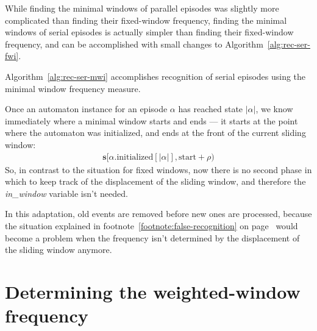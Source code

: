 While finding the minimal windows of parallel episodes was slightly more complicated than finding their fixed-window frequency, finding the minimal windows of serial episodes is actually simpler than finding their fixed-window frequency, and can be accomplished with small changes to Algorithm~\ref{alg:rec-ser-fwi}.

Algorithm~\ref{alg:rec-ser-mwi} accomplishes recognition of serial episodes using the minimal window frequency measure.

Once an automaton instance for an episode $ \alpha $ has reached state $ | \alpha | $, we know immediately where a minimal window starts and ends --- it starts at the point where the automaton was initialized, and ends at the front of the current sliding window:
\begin{align*}
\boldsymbol{s}[\alpha \text{.initialized}[| \alpha |], \allowbreak \text{start} + \rho)
\end{align*}
So, in contrast to the situation for fixed windows, now there is no second phase in which to keep track of the displacement of the sliding window, and therefore the \emph{in\_window} variable isn't needed.

In this adaptation, old events are removed before new ones are processed, because the situation explained in footnote~\ref{footnote:false-recognition} on page~\pageref{footnote:false-recognition} would become a problem when the frequency isn't determined by the displacement of the sliding window anymore.


\section{Determining the weighted-window frequency}
\label{sec:wwi}

